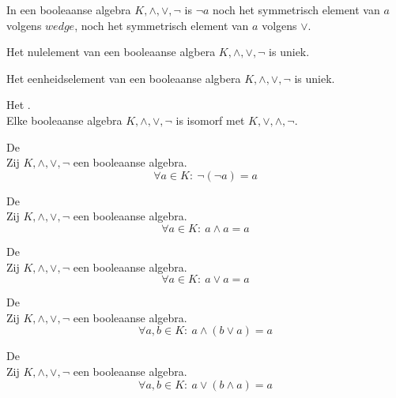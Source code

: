 \documentclass[main.tex]{subfiles}
\begin{document}
\begin{opm}
  In een booleaanse algebra $K,\wedge,\vee,\neg$ is $\neg a$ noch het symmetrisch element van $a$ volgens $wedge$, noch het symmetrisch element van $a$ volgens $\vee$.
\end{opm}

\begin{ei}
  Het nulelement van een booleaanse algbera $K,\wedge,\vee,\neg$ is uniek.
\end{ei}

\begin{ei}
  Het eenheidselement van een booleaanse algbera $K,\wedge,\vee,\neg$ is uniek.
\end{ei}

\begin{st}
  \label{ei:dualiteitsprincipe}
  Het .\\
  Elke booleaanse algebra $K,\wedge,\vee,\neg$ is isomorf met $K,\vee,\wedge,\neg$.
\end{st}

\begin{st}
  \label{st:involutie}
  De \\
  Zij $K,\wedge,\vee,\neg$ een booleaanse algebra.
  \[ \forall a \in K:\ \neg(\neg a) = a \]
\end{st}

\begin{st}
  \label{st:idempotentie-a-w-a}
  De \\
  Zij $K,\wedge,\vee,\neg$ een booleaanse algebra.
  \[ \forall a \in K:\ a \wedge a = a\]
\end{st}

\begin{st}
  \label{st:idempotentie-a-v-a}
  De \\
  Zij $K,\wedge,\vee,\neg$ een booleaanse algebra.
  \[ \forall a \in K:\ a \vee a = a \]
\end{st}

\begin{st}
  \label{st:absorptiewet-w-v}
  De \\
  Zij $K,\wedge,\vee,\neg$ een booleaanse algebra.
  \[ \forall a,b \in K:\ a \wedge (b \vee a) = a\]
\end{st}

\begin{st}
  \label{st:absorptiewet-v-w}
  De \\
  Zij $K,\wedge,\vee,\neg$ een booleaanse algebra.
  \[ \forall a,b \in K:\ a \vee (b \wedge a) = a\]
\end{st}
\end{document}
